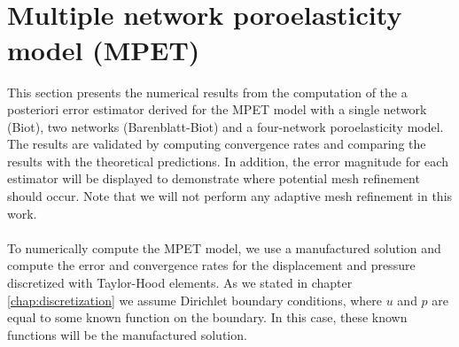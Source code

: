 \mbox{}\\ \\
\section{Multiple network poroelasticity model (MPET)} \label{section:num_exp_mpet}
This section presents the numerical results from the computation of the a posteriori error estimator derived for the MPET model with a single network (Biot), two networks (Barenblatt-Biot) and a four-network poroelasticity model. The results are validated by computing convergence rates and comparing the results with the theoretical predictions. In addition, the error magnitude for each estimator will be displayed to demonstrate where potential mesh refinement should occur. Note that we will not perform any adaptive mesh refinement in this work. 
\\
\\
To numerically compute the MPET model, we use a manufactured solution and compute the error and convergence rates for the displacement and pressure discretized with Taylor-Hood elements. As we stated in chapter \ref{chap:discretization} we assume Dirichlet boundary conditions, where $u$ and $p$ are equal to some known function on the boundary. In this case, these known functions will be the manufactured solution. 

